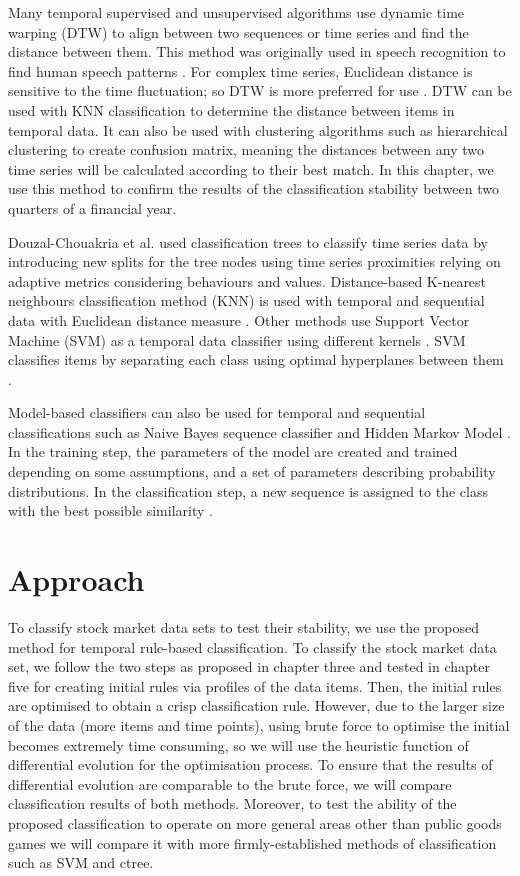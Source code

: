 Many temporal supervised and unsupervised algorithms use dynamic time warping (DTW) \cite{Berndt1994} to align between two sequences or time series and find the distance between them. This method was originally used in speech recognition to find human speech patterns \cite{rabiner1993fundamentals}. For complex time series, Euclidean distance is sensitive to the time fluctuation; so DTW is more preferred for use  \cite{KajanLaszl2006}. DTW can be used with KNN classification to determine the distance between items in temporal data. It can also be used with clustering algorithms such as hierarchical clustering to create confusion matrix, meaning the distances between any two time series will be calculated according to their best match. In this chapter, we use this method to confirm the results of the classification stability between two quarters of a financial year.

Douzal-Chouakria et al. \cite{Douzal-Chouakria2012} used classification trees to classify time series data by introducing new splits for the tree nodes using time series proximities relying on adaptive metrics considering behaviours and values. Distance-based K-nearest neighbours classification method (KNN) is used with temporal and sequential data with Euclidean distance measure \cite{Wei2006}.  Other methods use Support Vector Machine (SVM) as a temporal data classifier using different kernels  \cite{Sitaram2007}. SVM classifies items by separating each class using optimal hyperplanes between them \cite{Zaki2014}. 

Model-based classifiers can also be used for temporal and sequential classifications such as Naive Bayes sequence classifier \cite{Tseng2009} and Hidden Markov Model \cite{Oates1999}. In the training step, the parameters of the model are created and trained depending on some assumptions, and a set of parameters describing probability distributions. In the classification step, a new sequence is assigned to the class with the best possible similarity \cite{Xing2010}.



\section{Approach}
\label{sec:Approach_ch6}
To classify stock market data sets to test their stability, we use the proposed method for temporal rule-based classification. To classify the stock market data set, we follow the two steps as proposed in chapter three and tested in chapter five for creating initial rules via profiles of the data items.  Then, the initial rules are optimised to obtain a crisp classification rule. However, due to the larger size of the data (more items and time points), using brute force to optimise the initial becomes extremely time consuming, so we will use the heuristic function of differential evolution for the optimisation process. To ensure that the results of differential evolution are comparable to the brute force, we will compare classification results of both methods. Moreover, to test the ability of the proposed classification to operate on more general areas other than public goods games we will compare it with more firmly-established methods of classification such as SVM and ctree.

